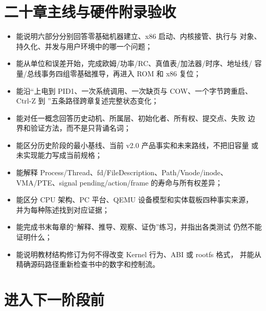 \section*{二十章主线与硬件附录验收}

\begin{itemize}
  \item 能说明六部分分别回答零基础机器建立、x86 启动、内核接管、执行与
        对象、持久化、并发与用户环境中的哪一个问题；
  \item 能从单位和误差开始，完成欧姆/功率/RC、真值表/加法器/时序、地址线/
        容量/总线事务四组零基础推导，再进入 ROM 和 x86 复位；
  \item 能沿“上电到 PID1、一次系统调用、一次缺页与 COW、一个字节跨重启、
        Ctrl-Z 到 ”五条路径跨章复述完整状态变化；
  \item 能对任一概念回答历史动机、所属层、初始化者、所有权、提交点、失败
        边界和验证方法，而不是只背诵名词；
  \item 能区分历史阶段的最小基线、当前 v2.0 产品事实和未来路线，不把旧容量
        或未实现能力写成当前规格；
  \item 能解释 Process/Thread、fd/FileDescription、Path/Vnode/inode、
        VMA/PTE、signal pending/action/frame 的寿命与所有权差异；
  \item 能区分 CPU 架构、PC 平台、QEMU 设备模型和实体载板四种事实来源，
        并为每种陈述找到对应证据；
  \item 能完成书末每章的“解释、推导、观察、证伪”练习，并指出各类测试
        仍然不能证明什么；
  \item 能说明教材结构修订为何不得改变 Kernel 行为、ABI 或 rootfs 格式，
        并能从精确源码路径重新检查书中的数字和控制流。
\end{itemize}

\section*{进入下一阶段前}

